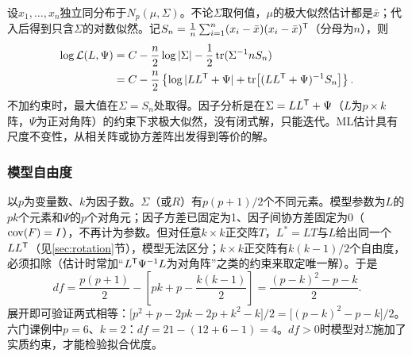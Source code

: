设$x_1,\ldots,x_n$独立同分布于$N_p(\mu,\Sigma)$。不论$\Sigma$取何值，$\mu$的极大似然估计都是$\bar x$；代入后得到只含$\Sigma$的对数似然。记$S_n=\frac1n\sum_{i=1}^n(x_i-\bar x)(x_i-\bar x)^{\mathsf T}$（分母为$n$），则
\begin{align*}
\log\mathcal L(L,\Psi)
&=C-\frac n2\log|\Sigma|-\frac12\operatorname{tr}(\Sigma^{-1}nS_n)\\
&=C-\frac n2\left\{\log|LL^{\mathsf T}+\Psi|+\operatorname{tr}\bigl[(LL^{\mathsf T}+\Psi)^{-1}S_n\bigr]\right\}.
\end{align*}
不加约束时，最大值在$\Sigma=S_n$处取得。因子分析是在$\Sigma=LL^{\mathsf T}+\Psi$（$L$为$p\times k$阵，$\Psi$为正对角阵）的约束下求极大似然，没有闭式解，只能迭代。ML估计具有尺度不变性，从相关阵或协方差阵出发得到等价的解。
\subsubsection{模型自由度}
以$p$为变量数、$k$为因子数。$\Sigma$（或$R$）有$p(p+1)/2$个不同元素。模型参数为$L$的$pk$个元素和$\Psi$的$p$个对角元；因子方差已固定为1、因子间协方差固定为0（$\operatorname{cov}(F)=I$），不再计为参数。但对任意$k\times k$正交阵$T$，$L^*=LT$与$L$给出同一个$LL^{\mathsf T}$（见\ref{sec:rotation}节），模型无法区分；$k\times k$正交阵有$k(k-1)/2$个自由度，必须扣除（估计时常加“$L^{\mathsf T}\Psi^{-1}L$为对角阵”之类的约束来取定唯一解）。于是
\begin{equation}
df=\frac{p(p+1)}2-\left[pk+p-\frac{k(k-1)}2\right]=\frac{(p-k)^2-p-k}{2}.\label{eq:fa-df}
\end{equation}
展开即可验证两式相等：$\bigl[p^2+p-2pk-2p+k^2-k\bigr]/2=\bigl[(p-k)^2-p-k\bigr]/2$。六门课例中$p=6$、$k=2$：$df=21-(12+6-1)=4$。$df>0$时模型对$\Sigma$施加了实质约束，才能检验拟合优度。

